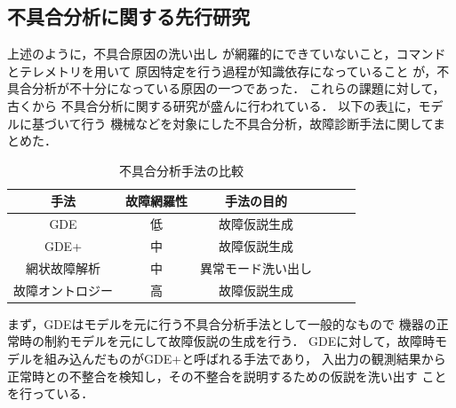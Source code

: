\documentclass[11pt]{jsreport}
\begin{document}


\subsection{不具合分析に関する先行研究}
上述のように，不具合原因の洗い出し
が網羅的にできていないこと，コマンドとテレメトリを用いて
原因特定を行う過程が知識依存になっていること
が，不具合分析が不十分になっている原因の一つであった．%
これらの課題に対して，古くから%
不具合分析に関する研究が盛んに行われている．
以下の表\ref{tab:previous_research}に，モデルに基づいて行う
機械などを対象にした不具合分析，故障診断手法に関してまとめた．
\begin{table}[H]
   \centering
   \caption{不具合分析手法の比較}
   \label{tab:previous_research}
      \begin{tabular}{cccccc} \hline%
         手法&故障網羅性&手法の目的%
         \\ \hline
         GDE&低&故障仮説生成%
         \\ %
         GDE+\cite{Struss1989}&中&故障仮説生成%
         \\
         網状故障解析\cite{Yamaguchi2014}&中&異常モード洗い出し%
         \\
         故障オントロジー\cite{Kitamura1999}&高&故障仮説生成%
         \\ \hline
      \end{tabular}
\end{table}
まず，GDEはモデルを元に行う不具合分析手法として一般的なもので
機器の正常時の制約モデルを元にして故障仮説の生成を行う．
GDEに対して，故障時モデルを組み込んだものがGDE+\cite{Struss1989}と呼ばれる手法であり，
入出力の観測結果から正常時との不整合を検知し，その不整合を説明するための仮説を洗い出す
ことを行っている．\\
\end{document}

